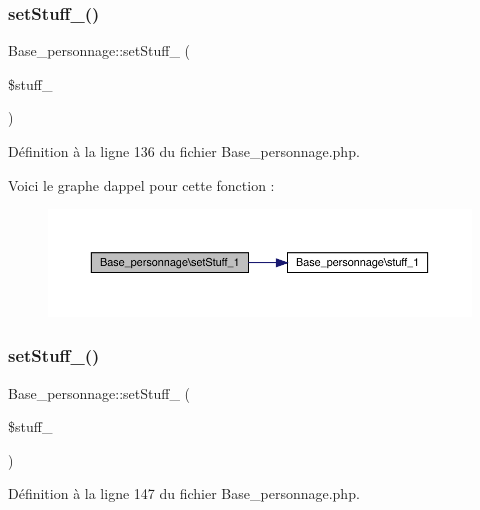 \subsubsection{\texorpdfstring{set\+Stuff\+\_()}{setStuff\_1()}}
{\footnotesize\ttfamily Base\+\_\+personnage\+::set\+Stuff\+\_ (\begin{DoxyParamCaption}\item[{}]{\$stuff\+\_ }\end{DoxyParamCaption})}



Définition à la ligne 136 du fichier Base\+\_\+personnage.\+php.

Voici le graphe d\textquotesingle{}appel pour cette fonction \+:\nopagebreak
\begin{figure}[H]
\begin{center}
\leavevmode
\includegraphics[width=350pt]{class_base__personnage_a1044ae4053449cbf15bad1700e47f05d_cgraph}
\end{center}
\end{figure}
\mbox{\label{class_base__personnage_abebf595054cb225477f869946d9ac1ae}} 
\subsubsection{\texorpdfstring{set\+Stuff\+\_()}{setStuff\_2()}}
{\footnotesize\ttfamily Base\+\_\+personnage\+::set\+Stuff\+\_ (\begin{DoxyParamCaption}\item[{}]{\$stuff\+\_ }\end{DoxyParamCaption})}



Définition à la ligne 147 du fichier Base\+\_\+personnage.\+php.


